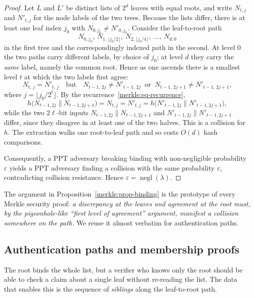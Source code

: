 \documentclass[11pt,a4paper]{article}
\theoremstyle{definition}
\theoremstyle{remark}
\DeclareMathOperator{\negl}{negl}
\begin{document}
\begin{proof}
Let \(L\) and \(L'\) be distinct lists of \(2^d\) leaves with equal roots, and write \(N_{t,j}\) and \(N'_{t,j}\) for the node labels of the two trees. Because the lists differ, there is at least one leaf index \(j_0\) with \(N_{0,j_0} \neq N'_{0,j_0}\). Consider the leaf-to-root path
\[
N_{0,j_0},\ N_{1,\lfloor j_0/2\rfloor},\ N_{2,\lfloor j_0/4\rfloor},\ \dots,\ N_{d,0}
\]
in the first tree and the correspondingly indexed path in the second. At level \(0\) the two paths carry different labels, by choice of \(j_0\); at level \(d\) they carry the \emph{same} label, namely the common root. Hence as one ascends there is a smallest level \(t\) at which the two labels first agree:
\[
N_{t,\,j} = N'_{t,\,j} \quad\text{but}\quad N_{t-1,\,2j} \neq N'_{t-1,\,2j} \ \text{ or } \ N_{t-1,\,2j+1} \neq N'_{t-1,\,2j+1},
\]
where \(j = \lfloor j_0 / 2^t \rfloor\). By the recurrence~\eqref{merkle:eq-recurrence},
\[
h\bigl(N_{t-1,2j} \| N_{t-1,2j+1}\bigr) = N_{t,j} = N'_{t,j} = h\bigl(N'_{t-1,2j} \| N'_{t-1,2j+1}\bigr),
\]
while the two \(2\ell\)-bit inputs \(N_{t-1,2j}\|N_{t-1,2j+1}\) and \(N'_{t-1,2j}\|N'_{t-1,2j+1}\) differ, since they disagree in at least one of the two halves. This is a collision for \(h\). The extraction walks one root-to-leaf path and so costs \(O(d)\) hash comparisons.

Consequently, a PPT adversary breaking binding with non-negligible probability \(\varepsilon\) yields a PPT adversary finding a collision with the same probability \(\varepsilon\), contradicting collision resistance. Hence \(\varepsilon = \negl(\lambda)\).
\end{proof}

The argument in Proposition~\ref{merkle:prop-binding} is the prototype of every Merkle security proof: \emph{a discrepancy at the leaves and agreement at the root must, by the pigeonhole-like ``first level of agreement'' argument, manifest a collision somewhere on the path.} We reuse it almost verbatim for authentication paths.

\subsection{Authentication paths and membership proofs}\label{merkle:sec-auth}

The root binds the whole list, but a verifier who knows only the root should be able to check a claim about a single leaf without re-reading the list. The data that enables this is the sequence of \emph{siblings} along the leaf-to-root path.
\end{document}
